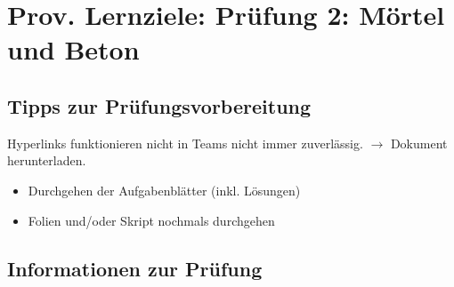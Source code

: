 



\newcommand{\blattname}{Prov. Lernziele: Prüfung 2: Mörtel und Beton}
\newcommand{\nrPruefung}{zweiten}
\newcommand{\Added}[1]{\textcolor{blue}{#1}}



\section*{\blattname}
\subsection*{Tipps zur Prüfungsvorbereitung}
Hyperlinks funktionieren nicht in Teams nicht immer zuverlässig. $\rightarrow$ Dokument herunterladen.
\begin{itemize}
	\item Durchgehen der Aufgabenblätter (inkl. Lösungen)

 	\item Folien und/oder Skript nochmals durchgehen
\end{itemize}

\subsection*{Informationen zur Prüfung}

